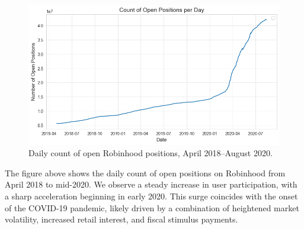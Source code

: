 \begin{figure}[h!]
    \centering
    \includegraphics[width=0.8\linewidth]{../images/old/no_positions_date.png}
    \caption{Daily count of open Robinhood positions, April 2018–August 2020.}
\end{figure}

The figure above shows the daily count of open positions on Robinhood from April 2018 to mid-2020. 
We observe a steady increase in user participation, with a sharp acceleration beginning in early 2020. 
This surge coincides with the onset of the COVID-19 pandemic, likely driven by a combination of heightened market volatility, increased retail interest, and fiscal stimulus payments.
